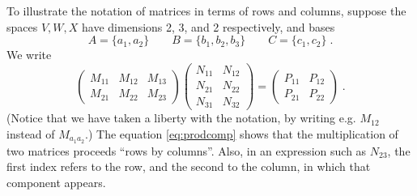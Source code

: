 \documentclass{article}
\begin{document}
To illustrate the notation of matrices in terms of rows and columns,
suppose the spaces $V,W,X$
have dimensions 2, 3, and 2 respectively, and bases
$$A=\{a_1,a_2\}\qquad B=\{b_1,b_2,b_3\}\qquad C=\{c_1,c_2\}\;.$$
We write
$$
\begin{pmatrix}
M_{11} & M_{12} & M_{13} \\
M_{21} & M_{22} & M_{23}
\end{pmatrix}
\begin{pmatrix}
N_{11} & N_{12} \\
N_{21} & N_{22} \\
N_{31} & N_{32}
\end{pmatrix}
=
\begin{pmatrix}
P_{11} & P_{12} \\
P_{21} & P_{22}
\end{pmatrix}\;.
$$
(Notice that we have taken a liberty with the notation,
by writing e.g. $M_{12}$ instead of $M_{a_1a_2}$.)
The equation \eqref{eq:prodcomp} shows that the multiplication
of two matrices proceeds ``rows by columns''. Also, in an expression such
as $N_{23}$, the first index refers to the row, and the second to the
column, in which that component appears.
\end{document}

